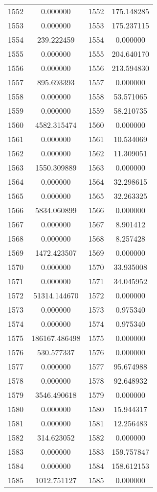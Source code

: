 \documentclass[12pt]{article}
\begin{document}
\begin{longtable}{@{}cccc@{}}
1552 & 0.000000 & 1552 & 175.148285 \\
1553 & 0.000000 & 1553 & 175.237115 \\
1554 & 239.222459 & 1554 & 0.000000 \\
1555 & 0.000000 & 1555 & 204.640170 \\
1556 & 0.000000 & 1556 & 213.594830 \\
1557 & 895.693393 & 1557 & 0.000000 \\
1558 & 0.000000 & 1558 & 53.571065 \\
1559 & 0.000000 & 1559 & 58.210735 \\
1560 & 4582.315474 & 1560 & 0.000000 \\
1561 & 0.000000 & 1561 & 10.534069 \\
1562 & 0.000000 & 1562 & 11.309051 \\
1563 & 1550.309889 & 1563 & 0.000000 \\
1564 & 0.000000 & 1564 & 32.298615 \\
1565 & 0.000000 & 1565 & 32.263325 \\
1566 & 5834.060899 & 1566 & 0.000000 \\
1567 & 0.000000 & 1567 & 8.901412 \\
1568 & 0.000000 & 1568 & 8.257428 \\
1569 & 1472.423507 & 1569 & 0.000000 \\
1570 & 0.000000 & 1570 & 33.935008 \\
1571 & 0.000000 & 1571 & 34.045952 \\
1572 & 51314.144670 & 1572 & 0.000000 \\
1573 & 0.000000 & 1573 & 0.975340 \\
1574 & 0.000000 & 1574 & 0.975340 \\
1575 & 186167.486498 & 1575 & 0.000000 \\
1576 & 530.577337 & 1576 & 0.000000 \\
1577 & 0.000000 & 1577 & 95.674988 \\
1578 & 0.000000 & 1578 & 92.648932 \\
1579 & 3546.490618 & 1579 & 0.000000 \\
1580 & 0.000000 & 1580 & 15.944317 \\
1581 & 0.000000 & 1581 & 12.256483 \\
1582 & 314.623052 & 1582 & 0.000000 \\
1583 & 0.000000 & 1583 & 159.757847 \\
1584 & 0.000000 & 1584 & 158.612153 \\
1585 & 1012.751127 & 1585 & 0.000000 \\

\end{longtable}
\end{document}
